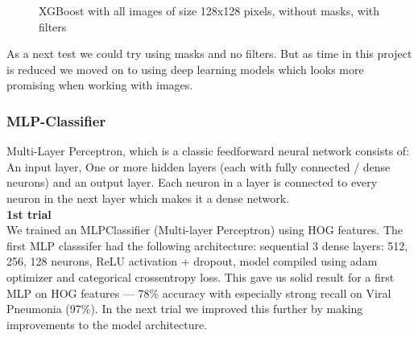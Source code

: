 \documentclass{article}
\begin{document}
\begin{figure}[!ht]
  \centering
  \qquad
  \caption{XGBoost with all images of size 128x128 pixels, without masks, with filters}
  \label{fig:XGBost_classifier_method_128_nomask_withfilter}
\end{figure}

As a next test we could try using masks and no filters. But as time in this project is reduced we moved on to using deep learning models which looks 
more promising when working with images. 

\subsubsection {MLP-Classifier} 
Multi-Layer Perceptron, which is a classic feedforward neural network consists of: An input layer, One or more hidden layers (each with fully connected / dense neurons) and an output layer. Each neuron in a layer is connected to every neuron in the next layer which makes it a dense network.\\
 
\textbf{1st trial}\\We trained an MLPClassifier (Multi-layer Perceptron) using HOG features. The first MLP classsifer had the following architecture: sequential 3 dense layers: 512, 256, 128 neurons, ReLU activation + dropout, model compiled using adam optimizer and categorical crossentropy loss. This gave us solid result for a first MLP on HOG features — 78\% accuracy with especially strong recall on Viral Pneumonia (97\%).
In the next trial we improved this further by making improvements to the model architecture.\\
\end{document}
